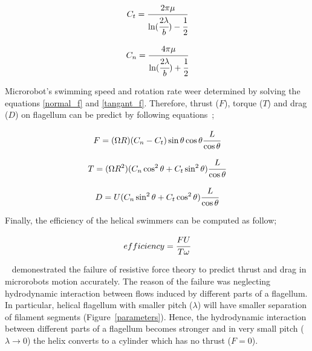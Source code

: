 \documentclass[12pt,a4paper,titlepage]{report}
\begin{document}
\begin{equation}
 C_t = \cfrac{2 \pi \mu}{\ln (\cfrac{2 \lambda}{b}) - \cfrac{1}{2}}
\label{Coeffient1}
\end{equation}



\begin{equation}
 C_n = \cfrac{4 \pi \mu}{\ln (\cfrac{2 \lambda}{b}) + \cfrac{1}{2}}
\label{Coeffient1}
\end{equation}

Microrobot\rq{}s swimming speed and rotation rate weer determined by solving 
the equations \ref{normal_f} and \ref{tangant_f}. Therefore, thrust ($F$), torque ($T$) and drag ($D$) 
on flagellum can be predict by following equations~\citep{rodenborn2013propulsion};

\begin{equation}
 F = (\Omega R)(C_n - C_t) \sin \theta \cos \theta \cfrac{L}{\cos \theta} 
\label{thrust}
\end{equation}

\begin{equation}
 T = (\Omega R^2)(C_n \cos ^2 \theta + C_t \sin ^2 \theta) \cfrac{L}{\cos \theta}
\label{torque}
\end{equation}

\begin{equation}
 D = U (C_n \sin ^2 \theta + C_t \cos ^2 \theta) \cfrac{L}{\cos \theta} 
\label{drag}
\end{equation}



Finally, the efficiency of the helical swimmers can be computed as follow;



\begin{equation}
 efficiency = \cfrac{FU}{T \omega} 
\label{efficiency}
\end{equation}

 

\citeauthor{rodenborn2013propulsion}~\citep{rodenborn2013propulsion} demonestrated the failure of resistive force
 theory to predict thrust and drag in microrobots motion accurately. The reason of the failure was neglecting hydrodynamic
interaction between flows induced by different parts of a flagellum. In particular, helical flagellum with
 smaller pitch ($\lambda$) will have smaller separation of filament segments (Figure~\ref{parameters}). Hence,
 the hydrodynamic interaction between different parts of a flagellum becomes stronger and in very small
pitch ($\lambda \to 0$) the helix converts to a cylinder which has no thrust ($F= 0$).
\end{document}
